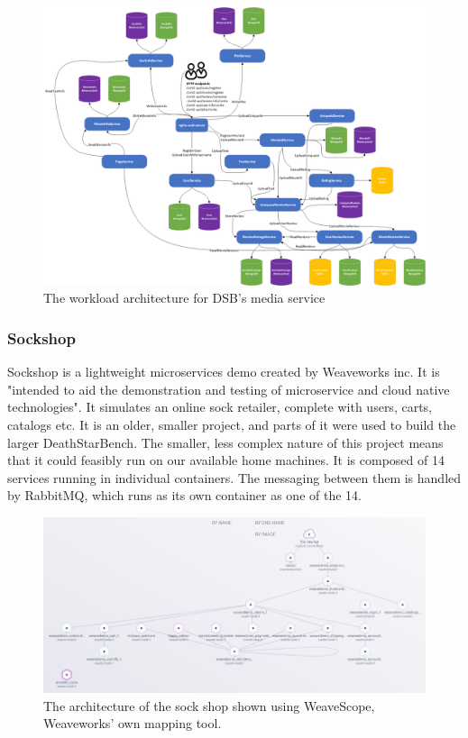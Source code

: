 \begin{figure} 
\centering 
\includegraphics[width=\columnwidth]{Figures/Charts/media_microservices_architecture.png}
\caption{The workload architecture for DSB's media service}
\label{DSB-media}
\end{figure}


\subsubsection{Sockshop}
Sockshop is a lightweight microservices demo created by Weaveworks inc. It is "intended to aid the demonstration and testing of microservice and cloud native technologies". \cite*{Weaveworks} It simulates an online sock retailer, complete with users, carts, catalogs etc. 
It is an older, smaller project, and parts of it were used to build the larger DeathStarBench. \cite*{Gan2019}
The smaller, less complex nature of this project means that it could feasibly run on our available home machines. 
It is composed of 14 services running in individual containers. The messaging between them is handled by RabbitMQ, which runs as its own container as one of the 14. 

\begin{figure}[ht] 
\centering 
\includegraphics[width=\columnwidth]{Figures/Charts/sockshop-scope_trimmed.png}
\caption{The architecture of the sock shop shown using WeaveScope, Weaveworks' own mapping tool.}
\label{Sockshop architecture}
\end{figure}

